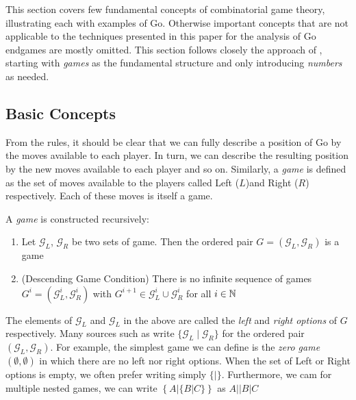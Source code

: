\documentclass[../math194_paper.tex]{subfiles}
\begin{document}
This section covers few fundamental concepts of combinatorial game 
theory, illustrating each with examples of Go. Otherwise important concepts that 
are not applicable to the techniques presented in this paper for the analysis of Go
endgames are mostly omitted.
This section follows closely the approach of \cite{schleicher2006introduction}, starting 
with \textit{games} as the fundamental structure and only introducing \textit{numbers} as needed.

\subsection{Basic Concepts}

From the rules, it should be clear that we can fully describe a position of Go 
by the moves available to each player. In turn, we can describe the resulting 
position by the new moves available to each player and so on. Similarly, a 
\textit{game} is defined as the set of moves available to the players called
Left ($L $)and Right ($R$) respectively. Each of these moves is itself a game.

\begin{definition}[Game] 
    A \textit{game} is constructed recursively:
    \begin{enumerate}
        \item Let $\mathcal{G}_L$, $\mathcal{G}_R$ be two sets of game. Then the ordered pair 
        $G = (\mathcal{G}_L,\mathcal{G}_R)$ is a game  
        \item (Descending Game Condition) There is no infinite sequence of games  
        $G^i = (\mathcal{G}_L^i,\mathcal{G}_R^i)$ with $G^{i+1} \in \mathcal{G}_L^i \cup \mathcal{G}_R^i$ for all $i \in \mathbb{N}$
    \end{enumerate}
\end{definition}

The elements of $\mathcal{G}_L$ and $\mathcal{G}_L$ in the above are called the \textit{left} and \textit{right options}
of $G$ respectively. Many sources such as \cite{berlekamp1994mathematical} write 
$\{\mathcal{G}_L \mid \mathcal{G}_R \}$ for the ordered pair $(\mathcal{G}_L,\mathcal{G}_R)$. 
For example, the simplest game we can define is the \textit{zero game} $(\emptyset, \emptyset)$ in which there are no left nor right options. When the set of Left or Right options is empty, we often prefer writing simply $\{|\}$. Furthermore, we cam
for multiple nested games, we can write $\left\{A | \{B | C\} \right\}$ as 
$A || B | C$
\end{document}
